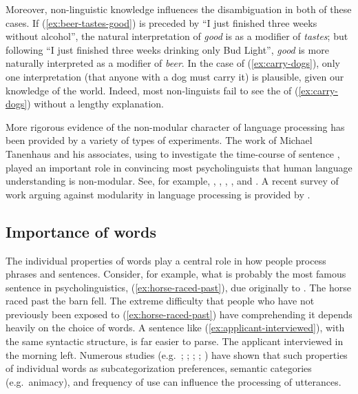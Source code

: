 \documentclass[output=paper
 	        ,biblatex
                ,babelshorthands
                ,newtxmath
                ,draftmode
                ,colorlinks, citecolor=brown
]{langscibook}
\begin{document}
Moreover, non-linguistic knowledge influences the disambiguation in both of these cases.  If (\ref{ex:beer-tastes-good}) is preceded by ``I just finished three weeks without alcohol'', the natural interpretation of \emph{good} is as a modifier of \emph{tastes}; but following ``I just finished three weeks drinking only Bud Light'', \emph{good} is more naturally interpreted as a modifier of \emph{beer}.  In the case of (\ref{ex:carry-dogs}), only one interpretation (that anyone with a dog must carry it) is plausible, given our knowledge of the world.  Indeed, most non-linguists fail to see the  of (\ref{ex:carry-dogs}) without a lengthy explanation.  

More rigorous evidence of the non-modular character of language processing has been provided by a variety of types of experiments.  The work of Michael Tanenhaus  and his associates, using  to investigate the time-course of sentence , played an important role in convincing most psycholinguists that human language understanding is non-modular.  See, for example, \citet{EberhardEtal95}, \citet{McMurrayEtal2008}, \citet{TSKES95a}, \citet{TSKES96a}, and \citet{TanenhausTrueswell95}. A recent survey of work arguing against modularity in language processing is provided by \citet{SpevackEtal2018}.  

\subsection{Importance of words}
\label{sec-importance-of-words}

The individual properties of words play a central role in how people process phrases and sentences.
Consider, for example, what is probably the most famous sentence in psycholinguistics,
(\ref{ex:horse-raced-past}), due originally to \citet[]{Bever70}.
\ea\label{ex:horse-raced-past}
The horse raced past the barn fell.
\z
The extreme difficulty that people who have not previously been exposed to (\ref{ex:horse-raced-past}) have comprehending it depends heavily on the choice of words.  A sentence like (\ref{ex:applicant-interviewed}), with the same syntactic structure, is far easier to parse.
\ea\label{ex:applicant-interviewed}
The applicant interviewed in the morning left.
\z
Numerous studies (e.g.\ \citealt{FordEtal82}; \citealt{TrueswellEtal93}; \citealt{MPS94a-u}; \citealt{BresnanEtal2007}; \citealt{WasowEtal2011}) have shown that such properties of individual words as subcategorization preferences, semantic categories (e.g.\ animacy), and frequency of use can influence the processing of utterances.  
\end{document}
